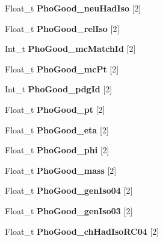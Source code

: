 \begin{DoxyCompactItemize}
Float\+\_\+t {\bfseries Pho\+Good\+\_\+neu\+Had\+Iso} \mbox{[}2\mbox{]}
\item 
\hypertarget{classMiniTree_a3a84d000f804dabccb162b43894a7ddb}{}\label{classMiniTree_a3a84d000f804dabccb162b43894a7ddb} 
Float\+\_\+t {\bfseries Pho\+Good\+\_\+rel\+Iso} \mbox{[}2\mbox{]}
\item 
\hypertarget{classMiniTree_a7651a100654e38c25b956c0bcc4774f3}{}\label{classMiniTree_a7651a100654e38c25b956c0bcc4774f3} 
Int\+\_\+t {\bfseries Pho\+Good\+\_\+mc\+Match\+Id} \mbox{[}2\mbox{]}
\item 
\hypertarget{classMiniTree_a535ab870f638c02e232277d424425a0d}{}\label{classMiniTree_a535ab870f638c02e232277d424425a0d} 
Float\+\_\+t {\bfseries Pho\+Good\+\_\+mc\+Pt} \mbox{[}2\mbox{]}
\item 
\hypertarget{classMiniTree_a6e277b296d7a07d02cc3aba39f2aff61}{}\label{classMiniTree_a6e277b296d7a07d02cc3aba39f2aff61} 
Int\+\_\+t {\bfseries Pho\+Good\+\_\+pdg\+Id} \mbox{[}2\mbox{]}
\item 
\hypertarget{classMiniTree_aeba3fd985b16cb170dc8affe38beead1}{}\label{classMiniTree_aeba3fd985b16cb170dc8affe38beead1} 
Float\+\_\+t {\bfseries Pho\+Good\+\_\+pt} \mbox{[}2\mbox{]}
\item 
\hypertarget{classMiniTree_a247f248c2a92ca1922bcc9f7f7683fec}{}\label{classMiniTree_a247f248c2a92ca1922bcc9f7f7683fec} 
Float\+\_\+t {\bfseries Pho\+Good\+\_\+eta} \mbox{[}2\mbox{]}
\item 
\hypertarget{classMiniTree_a018d222e04addc42d8092d9511db9ce9}{}\label{classMiniTree_a018d222e04addc42d8092d9511db9ce9} 
Float\+\_\+t {\bfseries Pho\+Good\+\_\+phi} \mbox{[}2\mbox{]}
\item 
\hypertarget{classMiniTree_afffbc275461de7d858ad95d8c95d22fb}{}\label{classMiniTree_afffbc275461de7d858ad95d8c95d22fb} 
Float\+\_\+t {\bfseries Pho\+Good\+\_\+mass} \mbox{[}2\mbox{]}
\item 
\hypertarget{classMiniTree_a178a987b80c424cdbfcb838ab81c1def}{}\label{classMiniTree_a178a987b80c424cdbfcb838ab81c1def} 
Float\+\_\+t {\bfseries Pho\+Good\+\_\+gen\+Iso04} \mbox{[}2\mbox{]}
\item 
\hypertarget{classMiniTree_ac0d244475fb4cb3c6bb3f8055a6bd575}{}\label{classMiniTree_ac0d244475fb4cb3c6bb3f8055a6bd575} 
Float\+\_\+t {\bfseries Pho\+Good\+\_\+gen\+Iso03} \mbox{[}2\mbox{]}
\item 
\hypertarget{classMiniTree_a980f9dcc2490ee0b30e22b85dbb1d67a}{}\label{classMiniTree_a980f9dcc2490ee0b30e22b85dbb1d67a} 
Float\+\_\+t {\bfseries Pho\+Good\+\_\+ch\+Had\+Iso\+R\+C04} \mbox{[}2\mbox{]}

\end{DoxyCompactItemize}
